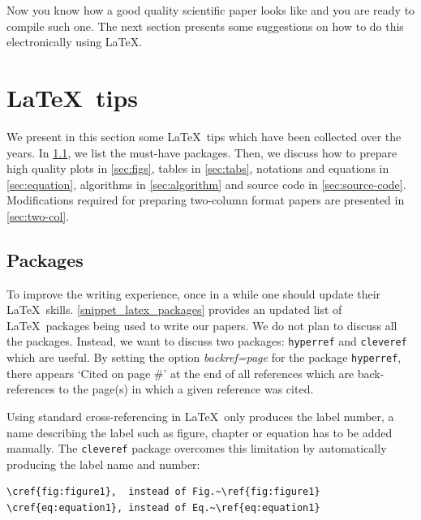 \documentclass[authoryear,3p,times,preprint,review,fleqn]{elsarticle}
\numberwithin{equation}{section}
\theoremstyle{remark}
\begin{document}
Now you know how a good quality scientific paper looks like and you are ready to compile such one. The next section presents some suggestions on how to do this electronically using \LaTeX. \\

% 


\section{\LaTeX\ tips}\label{sec:latex}

We present in this section some \LaTeX\ tips which have been collected over the years. In \cref{sec:packages}, we list the must-have packages. Then, we discuss how to prepare high quality plots in \cref{sec:figs}, tables in 
\cref{sec:tabs},  notations and equations in \cref{sec:equation}, algorithms in \cref{sec:algorithm} and source code in \cref{sec:source-code}. Modifications required for preparing two-column format papers are presented in \cref{sec:two-col}.

\subsection{Packages}\label{sec:packages}


To improve the writing experience, once in a while one should update their \LaTeX\ skills. \cref{snippet_latex_packages} provides an updated list of \LaTeX\ packages being used to write our papers.
We do not plan to discuss all the packages. Instead, we want to discuss two packages: \texttt{hyperref} and \texttt{cleveref} which are useful.
By setting the option \textit{backref=page} for the package \texttt{hyperref}, there appears `Cited on page \#' at the end of all references which are back-references  to the page(s)  in which a given reference was cited.


Using standard cross-referencing in \LaTeX\ only produces the label number, a name describing the label such as figure, chapter or equation has to be added manually. The \texttt{cleveref} package overcomes this limitation by automatically producing the label name and number:

\begin{verbatim}
\cref{fig:figure1},  instead of Fig.~\ref{fig:figure1}
\cref{eq:equation1}, instead of Eq.~\ref{eq:equation1}
\end{verbatim}
\end{document}
